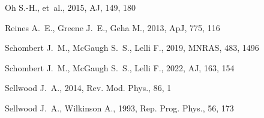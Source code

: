 \begin{thebibliography}{}
Oh S.-H., et~al., 2015, AJ, 149, 180

Reines A.~E., Greene J.~E., Geha M., 2013, ApJ, 775, 116

Schombert J.~M., McGaugh S.~S., Lelli F., 2019, MNRAS, 483, 1496

Schombert J.~M., McGaugh S.~S., Lelli F., 2022, AJ, 163, 154

Sellwood J.~A., 2014, Rev. Mod. Phys., 86, 1

Sellwood J.~A., Wilkinson A., 1993, Rep. Prog. Phys., 56, 173

\end{thebibliography}